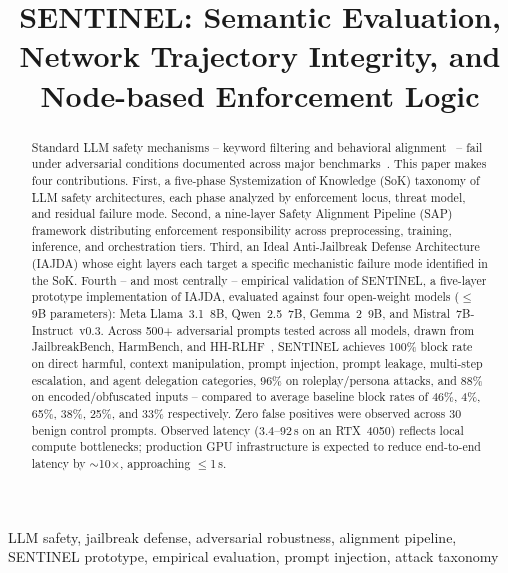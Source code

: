 \documentclass[conference]{IEEEtran}
\begin{document}
\title{SENTINEL: Semantic Evaluation, Network Trajectory Integrity, and Node-based Enforcement Logic}

\author{%
}

\maketitle

\begin{abstract}
Standard LLM safety mechanisms -- keyword filtering and behavioral
alignment~\cite{ouyang2022training,bai2022constitutional} -- fail under
adversarial conditions documented across major
benchmarks~\cite{wei2023jailbroken,zou2023universal,mazeika2024harmbench,
chao2024jailbreakbench}.
This paper makes four contributions.
First, a five-phase Systemization of Knowledge (SoK) taxonomy of LLM safety
architectures, each phase analyzed by enforcement locus, threat model, and
residual failure mode.
Second, a nine-layer Safety Alignment Pipeline (SAP) framework distributing
enforcement responsibility across preprocessing, training, inference, and
orchestration tiers.
Third, an Ideal Anti-Jailbreak Defense Architecture (IAJDA) whose eight layers
each target a specific mechanistic failure mode identified in the SoK.
Fourth -- and most centrally -- empirical validation of SENTINEL, a
five-layer prototype implementation of IAJDA, evaluated against four
open-weight models ($\leq$9B parameters): Meta Llama~3.1~8B, Qwen~2.5~7B,
Gemma~2~9B, and Mistral~7B-Instruct~v0.3.
Across 500$+$ adversarial prompts tested across all models, drawn from JailbreakBench,
HarmBench, and HH-RLHF~\cite{chao2024jailbreakbench,mazeika2024harmbench,bai2022training},
SENTINEL achieves 100\% block rate on direct harmful, context manipulation,
prompt injection, prompt leakage, multi-step escalation, and agent delegation
categories, 96\% on roleplay/persona attacks, and 88\% on encoded/obfuscated
inputs -- compared to average baseline block rates of 46\%, 4\%, 65\%, 38\%,
25\%, and 33\% respectively.
Zero false positives were observed across 30 benign control prompts.
Observed latency (3.4--92\,s on an RTX~4050) reflects local compute bottlenecks;
production GPU infrastructure is expected to reduce end-to-end latency by
$\sim$10$\times$, approaching $\leq$1\,s.
\end{abstract}

\begin{IEEEkeywords}
LLM safety, jailbreak defense, adversarial robustness, alignment pipeline,
SENTINEL prototype, empirical evaluation, prompt injection, attack taxonomy
\end{IEEEkeywords}
\end{document}
